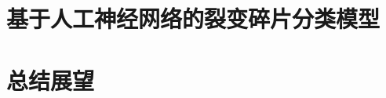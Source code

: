\documentclass[14pt, AutoFakeBold]{ldr}
\begin{document}







\section{基于人工神经网络的裂变碎片分类模型}




\section{总结展望}
\end{document}
